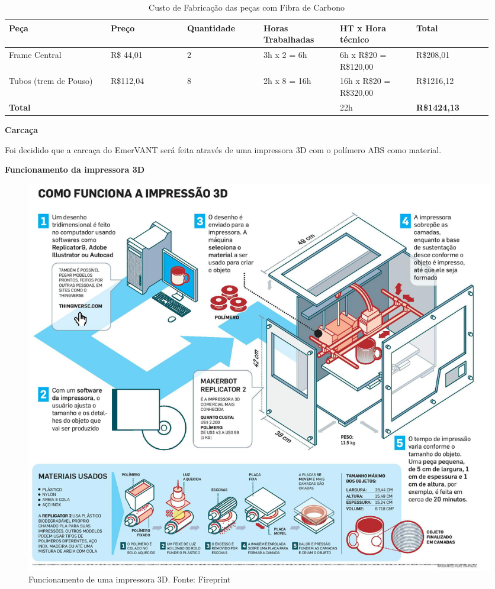 \begin{table}[!h]
\centering
    \caption{Custo de Fabricação das peças com Fibra de Carbono}
\begin{tabular}{|p{0.20\linewidth}|p{0.15\linewidth}|p{0.15\linewidth}|p{0.15\linewidth}|p{0.15\linewidth}|p{0.15\linewidth}|}
\hline

Peça & Preço& Quantidade& Horas Trabalhadas &HT x Hora técnico& Total\\ \hline
Frame Central &R\$ 44,01& 2 &3h x 2 = 6h& 6h x R\$20 = R\$120,00& R\$208,01 \\ \hline
Tubos (trem de Pouso)& R\$112,04& 8 &2h x 8 = 16h &16h x R\$20 = R\$320,00& R\$1216,12\\ \hline
\textbf{Total} & & & & 22h & \textbf{R\$1424,13}\\ \hline

\end{tabular}
    \label{custos_carregador}
\end{table}

\pagebreak
\indent \textbf{Carcaça}

Foi decidido que a carcaça do EmerVANT será feita através de uma impressora 3D
com o polímero ABS como material.

\indent \indent \textbf{Funcionamento da impressora 3D}

\begin{figure}[H]
    \centering
      \includegraphics[keepaspectratio=true,scale=0.25]{figuras/impressao3D.jpg}
    \caption{Funcionamento de uma impressora 3D. Fonte: Fireprint\protect\footnotemark}
    \label{fig:impressao3D}
\end{figure}

